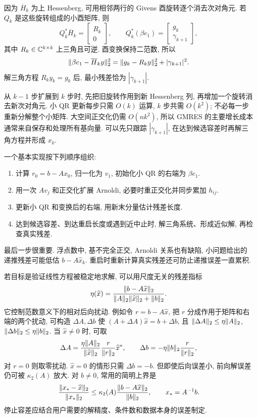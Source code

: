 因为 $\overline H_k$ 为上 Hessenberg, 可用相邻两行的 Givens 酉旋转逐个消去次对角元. 若 $Q_k$ 是这些旋转组成的小酉矩阵, 则
\[
Q_k^*\overline H_k=\begin{bmatrix}R_k\\0\end{bmatrix},\qquad
Q_k^*(\beta e_1)=\begin{bmatrix}g_k\\\gamma_{k+1}\end{bmatrix},
\]
其中 $R_k\in\mathbb C^{k\times k}$ 上三角且可逆. 酉变换保持二范数, 所以
\[
\lVert \beta e_1-\overline H_ky\rVert_2^2
=\lVert g_k-R_ky\rVert_2^2+|\gamma_{k+1}|^2.
\]
解三角方程 $R_ky_k=g_k$ 后, 最小残差恰为 $|\gamma_{k+1}|$.

从 $k-1$ 步扩展到 $k$ 步时, 先把旧旋转作用到新 Hessenberg 列, 再增加一个旋转消去新次对角元. 小 QR 更新每步只需 $O(k)$ 运算, $k$ 步共需 $O(k^2)$; 不必每一步重新分解整个小矩阵. 大空间正交化仍需 $O(nk^2)$, 所以 GMRES 的主要增长成本通常来自保存和处理所有基向量. 可以先只跟踪 $|\gamma_{k+1}|$, 在达到候选容差时再解三角方程并形成 $x_k$.

一个基本实现按下列顺序组织:
\begin{enumerate}
\item 计算 $r_0=b-Ax_0$, 归一化为 $v_1$, 初始化小 QR 的右端为 $\beta e_1$.
\item 用一次 $Av_j$ 和正交化扩展 Arnoldi, 必要时重正交化并同步累加 $h_{ij}$.
\item 更新小 QR 和变换后的右端, 用新末分量估计残差长度.
\item 达到候选容差、到达重启长度或遇到近中止时, 解三角系统、形成近似解, 再检查真实残差.
\end{enumerate}
最后一步很重要. 浮点数中, 基不完全正交, Arnoldi 关系也有缺陷, 小问题给出的递推残差可能低估 $b-A\widehat x_k$. 重启时重新计算真实残差还可防止递推误差一直累积.

若目标是验证线性方程被稳定地求解, 可以用尺度无关的残差指标
\begin{equation}\label{eq:linear-backward-indicator}
\eta(\widehat x)=\frac{\lVert b-A\widehat x\rVert_2}
{\lVert A\rVert_2\lVert \widehat x\rVert_2+\lVert b\rVert_2}.
\end{equation}
它控制范数意义下的相对后向扰动. 例如令 $r=b-A\widehat x$, 把 $r$ 分成作用于矩阵和右端的两个扰动, 可构造 $\Delta A,\Delta b$ 使
$(A+\Delta A)\widehat x=b+\Delta b$, 且
$\lVert \Delta A\rVert_2\le\eta\lVert A\rVert_2$, $\lVert \Delta b\rVert_2\le\eta\lVert b\rVert_2$.
当 $\widehat x\ne0$ 时, 可取
\[
\Delta A=\frac{\eta\lVert A\rVert_2}{\lVert \widehat x\rVert_2}
\frac{r}{\lVert r\rVert_2}\widehat x^*,\qquad
\Delta b=-\eta\lVert b\rVert_2\frac{r}{\lVert r\rVert_2},
\]
对 $r=0$ 则取零扰动. $\widehat x=0$ 的情形只需 $\Delta b=-b$. 但即使后向误差小, 前向解误差仍可被 $\kappa_2(A)$ 放大. 对 $b\ne0$, 常用的简明上界是
\[
\frac{\lVert x_* -\widehat x\rVert_2}{\lVert x_*\rVert_2}
\le\kappa_2(A)\frac{\lVert b-A\widehat x\rVert_2}{\lVert b\rVert_2},
\qquad x_*=A^{-1}b.
\]
停止容差应结合用户需要的解精度、条件数和数据本身的误差制定.

